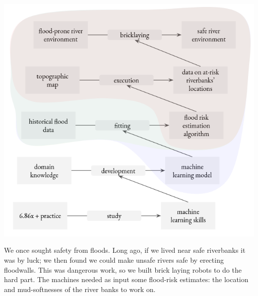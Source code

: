 \documentclass[11pt, justified]{tufte-book}
\theoremstyle{definition}
\begin{document}
        \begin{marginfigure}
            \includegraphics[width=1.0\textwidth]{seven-days}
            \caption{%
              Machine learning continues our human tradition toward the systematic and automatic.
              What for one generation is a luckily discovered idea or recipe
              (bottom tip of red), the next generation refines by
              careful human thought (green). 
              What to one generation is a task (green) requiring human thought
              is to a future generation merely a routine parameterized by some
              newly discovered recipe (bottom tip of blue).
              And the cycle repeats.
            }
        \end{marginfigure}

        We once sought safety from floods.  Long ago, if we lived near safe
        riverbanks it was by luck; we then found we could make unsafe rivers safe
        by erecting floodwalls.  This was dangerous work, so we built brick
        laying robots to do the hard part.  The machines needed as input some
        flood-risk estimates: the location and mud-softnesses of the river banks to
        work on.
\end{document}
